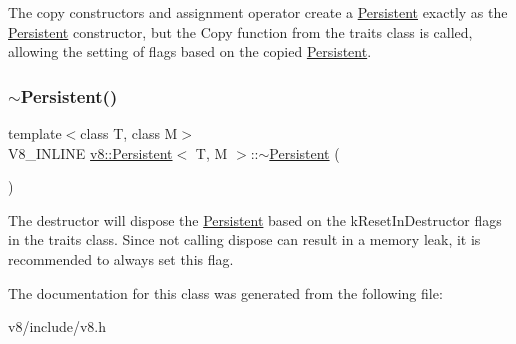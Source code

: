 The copy constructors and assignment operator create a \mbox{\hyperlink{classv8_1_1Persistent}{Persistent}} exactly as the \mbox{\hyperlink{classv8_1_1Persistent}{Persistent}} constructor, but the Copy function from the traits class is called, allowing the setting of flags based on the copied \mbox{\hyperlink{classv8_1_1Persistent}{Persistent}}. \mbox{\label{classv8_1_1Persistent_a7d4d2bebfe3919e447e22adc15464e25}} 
\subsubsection{\texorpdfstring{$\sim$\+Persistent()}{~Persistent()}}
{\footnotesize\ttfamily template$<$class T, class M$>$ \\
V8\+\_\+\+I\+N\+L\+I\+NE \mbox{\hyperlink{classv8_1_1Persistent}{v8\+::\+Persistent}}$<$ T, M $>$\+::$\sim$\mbox{\hyperlink{classv8_1_1Persistent}{Persistent}} (\begin{DoxyParamCaption}{ }\end{DoxyParamCaption})\hspace{0.3cm}{\ttfamily [inline]}}

The destructor will dispose the \mbox{\hyperlink{classv8_1_1Persistent}{Persistent}} based on the k\+Reset\+In\+Destructor flags in the traits class. Since not calling dispose can result in a memory leak, it is recommended to always set this flag. 

The documentation for this class was generated from the following file\+:\begin{DoxyCompactItemize}
\item 
v8/include/v8.\+h\end{DoxyCompactItemize}
